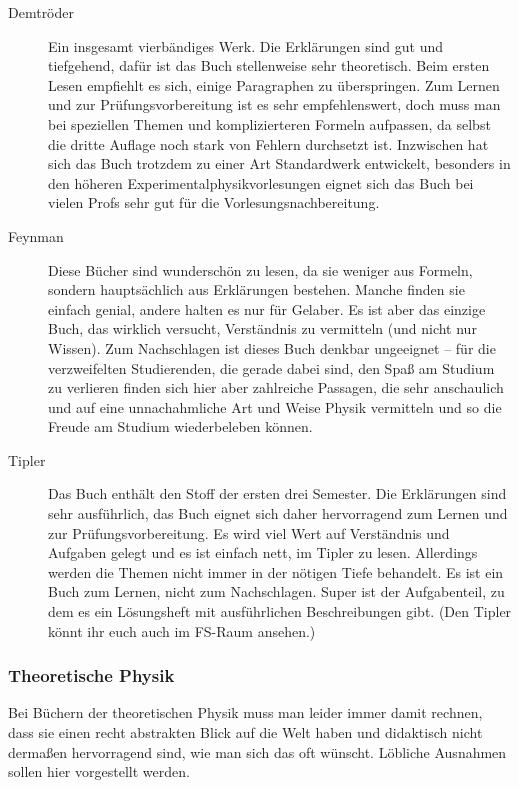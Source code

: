 \begin{description}
\item[Demtröder]{
		Ein insgesamt vierbändiges Werk. Die Erklärungen sind gut und tiefgehend, dafür ist das Buch stellenweise sehr theoretisch. Beim ersten Lesen empfiehlt es sich, einige Paragraphen zu überspringen. Zum Lernen und zur Prüfungsvorbereitung ist es sehr empfehlenswert, doch muss man bei speziellen Themen und komplizierteren Formeln aufpassen, da selbst die dritte Auflage noch stark von Fehlern durchsetzt ist. Inzwischen hat sich das Buch trotzdem zu einer Art Standardwerk entwickelt, besonders in den höheren Experimentalphysikvorlesungen eignet sich das Buch bei vielen Profs sehr gut für die Vorlesungsnachbereitung.}

\item[Feynman]{
		Diese Bücher sind wunderschön zu lesen, da sie weniger aus Formeln, sondern hauptsächlich aus Erklärungen bestehen. Manche finden sie einfach genial, andere halten es nur für Gelaber. Es ist aber das einzige Buch, das wirklich versucht, Verständnis zu vermitteln (und nicht nur Wissen). Zum Nachschlagen ist dieses Buch denkbar ungeeignet -- für die verzweifelten Studierenden, die gerade dabei sind, den Spaß am Studium zu verlieren finden sich hier aber zahlreiche Passagen, die sehr anschaulich und auf eine unnachahmliche Art und Weise Physik vermitteln und so die Freude am Studium wiederbeleben können.}

\item[Tipler]{
		Das Buch enthält den Stoff der ersten drei Semester. Die Erklärungen sind sehr ausführlich, das Buch eignet sich daher hervorragend zum Lernen und zur Prüfungsvorbereitung. Es wird viel Wert auf Verständnis und Aufgaben gelegt und es ist einfach nett, im Tipler zu lesen. Allerdings werden die Themen nicht immer in der nötigen Tiefe behandelt. Es ist ein Buch zum Lernen, nicht zum Nachschlagen. Super ist der Aufgabenteil, zu dem es ein Lösungsheft mit ausführlichen Beschreibungen gibt. (Den Tipler könnt ihr euch auch im FS-Raum ansehen.)}
\end{description}

\subsubsection*{Theoretische Physik}

Bei Büchern der theoretischen Physik muss man leider immer damit rechnen, dass sie einen recht abstrakten Blick auf die Welt haben und didaktisch nicht dermaßen hervorragend sind, wie man sich das oft wünscht. Löbliche Ausnahmen sollen hier vorgestellt werden.

